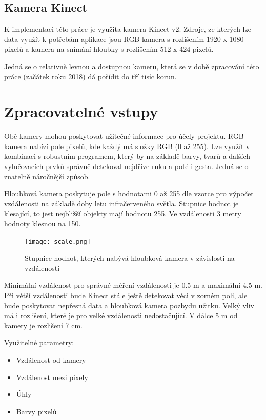 \subsection{Kamera Kinect}
K implementaci této práce je využita kamera Kinect v2. Zdroje, ze kterých lze data využít k potřebám aplikace jsou RGB kamera s rozlišením 1920 x 1080 pixelů a kamera na snímání hloubky s rozlišením 512 x 424 pixelů.

Jedná se o relativně levnou a dostupnou kameru, která se v době zpracování této práce (začátek roku 2018) dá pořídit do tří tisíc korun.

\section{Zpracovatelné vstupy}

Obě kamery mohou poskytovat užitečné informace pro účely projektu. RGB kamera nabízí pole pixelů, kde každý má složky RGB (0 až 255). Lze využít v kombinaci s robustním programem, který by na základě barvy, tvarů a dalších vylučovacích prvků správně detekoval nejdříve ruku a poté i gesta. Jedná se o znatelně náročnější způsob.

Hloubková kamera poskytuje pole s hodnotami 0 až 255 dle vzorce pro výpočet vzdálenosti na základě doby letu infračerveného světla. Stupnice hodnot je klesající, to jest nejbližší objekty mají hodnotu 255. Ve vzdálenosti 3 metry hodnoty klesnou na 150. 

\begin{figure}[htp]
\centering
\texttt{[image: scale.png]}
\caption{Stupnice hodnot, kterých nabývá hloubková kamera v závislosti na vzdálenosti}
\label{fig:scale}
\label{pic9}
\end{figure}

Minimální vzdálenost pro správné měření vzdálenosti je 0.5 m a maximální 4.5 m. Při větší vzdálenosti bude Kinect stále ještě detekovat věci v zorném poli, ale bude poskytovat nepřesná data a hloubková kamera pozbydu užitku. Velký vliv má i rozlišení, které je pro velké vzdálenosti nedostačující. V dálce 5 m od kamery je rozlišení 7 cm.

Využitelné parametry:

\begin{itemize}
\item Vzdálenost od kamery
\item Vzdálenost mezi pixely
\item Úhly
\item Barvy pixelů
\end{itemize}

